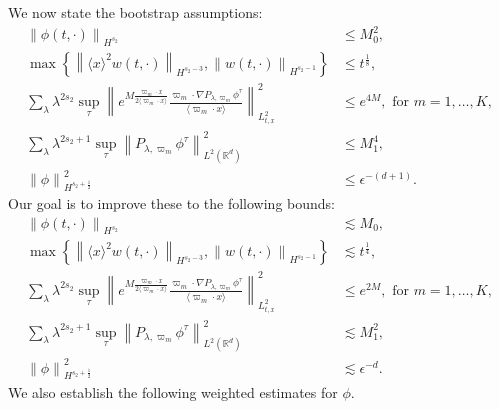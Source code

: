 \documentclass[10pt,twoside,a4paper]{article}
\numberwithin{equation}{section}\allowdisplaybreaks
\def\leq{\leqslant}
\begin{document}
We now state the bootstrap assumptions:
\begin{align}
	\left\| \phi (t,\cdot) \right\|_{H^{s_2}} &\leq M_0^2, \label{bstrap_ass1}\\
	\max \left\{\left\|\langle x\rangle^2 w(t,\cdot) \right\|_{H^{s_2-3}},	\left\| w(t,\cdot) \right\|_{H^{s_2-1}} \right\}&\leq t^{\frac 18}, \label{bstrap_ass2}\\
	\sum_{\lambda} \lambda^{2s_2}\sup_{\tau}\left\|  e^{M \frac{\varpi_m\cdot x}{2\langle \varpi_m\cdot x\rangle} }  \frac{\varpi_m \cdot\nabla P_{\lambda, \varpi_m}  \phi^{\tau}}{\langle \varpi_m\cdot x\rangle} \right\|_{L^2_{t,x}}^2 &\leq e^{4M}, \text{  for  } m =1,\dots ,K, \label{bstrap_ass3}\\
	\sum_{\lambda} \lambda^{2s_2+1}\sup_{\tau} \left\| P_{\lambda, \varpi_m}  \phi^\tau\right\|_{L^2(\mathbb{R}^d)}^2 &\leq M_1^4,\label{bstrap_ass4}\\
	\left\|\phi\right\|_{H^{s_2+\frac 12}}^2  &\leq  \epsilon^{-(d+1)}.\label{bstrap_ass5}
\end{align}
Our goal is to improve these to the following bounds:
\begin{align}
	\left\| \phi (t,\cdot) \right\|_{H^{s_2}} &\lesssim M_0, \label{bstrap_re1}\\
	\max \left\{\left\|\langle x\rangle^2 w(t,\cdot) \right\|_{H^{s_2-3}},	\left\| w(t,\cdot) \right\|_{H^{s_2-1}} \right\} &\lesssim t^{\frac 14}, \label{bstrap_re2}\\
	\sum_{\lambda} \lambda^{2s_2}\sup_{\tau}\left\|  e^{M \frac{\varpi_m\cdot x}{2\langle \varpi_m\cdot x\rangle} }  \frac{\varpi_m \cdot\nabla P_{\lambda, \varpi_m}  \phi^{\tau}}{\langle \varpi_m\cdot x\rangle} \right\|_{L^2_{t,x}}^2 &\leq e^{2M}, \text{  for  } m =1,\dots ,K,\label{bstrap_re3}\\
	\sum_{\lambda} \lambda^{2s_2+1} \sup_{\tau}\left\| P_{\lambda, \varpi_m}  \phi^\tau\right\|_{L^2(\mathbb{R}^d)}^2 &\lesssim M_1^2,\label{bstrap_re4}\\
	\left\|\phi\right\|_{H^{s_2+\frac 12}}^2  &\lesssim  \epsilon^{-d} \label{bstrap_re5}.
\end{align}
We also establish the following weighted estimates for $\phi$.
\end{document}

